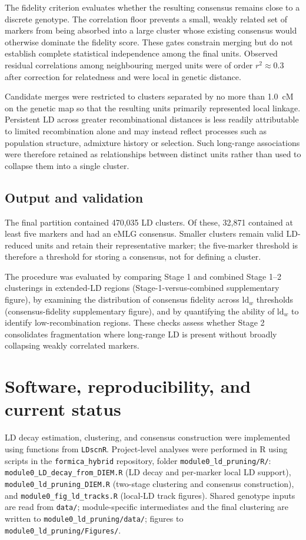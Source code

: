 \documentclass[11pt]{article}
\begin{document}
The fidelity criterion evaluates whether the resulting consensus remains close
to a discrete genotype. The correlation floor prevents a small, weakly related
set of markers from being absorbed into a large cluster whose existing
consensus would otherwise dominate the fidelity score. These gates constrain
merging but do not establish complete statistical independence among the final
units. Observed residual correlations among neighbouring merged units were of
order \(r^2\approx0.3\) after correction for relatedness and were local in
genetic distance.

Candidate merges were restricted to clusters separated by no more than 1.0~cM on the genetic map so that the resulting units primarily represented local linkage. Persistent LD across greater recombinational distances is less readily attributable to limited recombination alone and may instead reflect processes such as population structure, admixture history or selection. Such long-range associations were therefore retained as relationships between distinct units rather than used to collapse them into a single cluster.

\subsection{Output and validation}

The final partition contained 470,035 LD clusters. Of these, 32,871 contained
at least five markers and had an eMLG consensus. Smaller
clusters remain valid LD-reduced units and retain their representative marker;
the five-marker threshold is therefore a threshold for storing a consensus,
not for defining a cluster.

The procedure was evaluated by comparing Stage 1 and combined Stage 1--2
clusterings in extended-LD regions (Stage-1-versus-combined supplementary figure), by examining the
distribution of consensus fidelity across \(\mathrm{ld}_w\) thresholds
(consensus-fidelity supplementary figure), and by quantifying the ability of
\(\mathrm{ld}_w\) to identify low-recombination regions. These checks assess
whether Stage 2 consolidates fragmentation where long-range LD is present
without broadly collapsing weakly correlated markers.


\section{Software, reproducibility, and current status}

LD decay estimation, clustering, and consensus construction were implemented
using functions from \texttt{LDscnR}. Project-level analyses were performed in R
using scripts in the \texttt{formica\_hybrid} repository, folder
\texttt{module0\_ld\_pruning/R/}: \texttt{module0\_LD\_decay\_from\_DIEM.R} (LD
decay and per-marker local LD support), \texttt{module0\_ld\_pruning\_DIEM.R}
(two-stage clustering and consensus construction), and
\texttt{module0\_fig\_ld\_tracks.R} (local-LD track figures). Shared genotype
inputs are read from \texttt{data/}; module-specific intermediates and the final
clustering are written to \texttt{module0\_ld\_pruning/data/}; figures to
\texttt{module0\_ld\_pruning/Figures/}.
\end{document}

